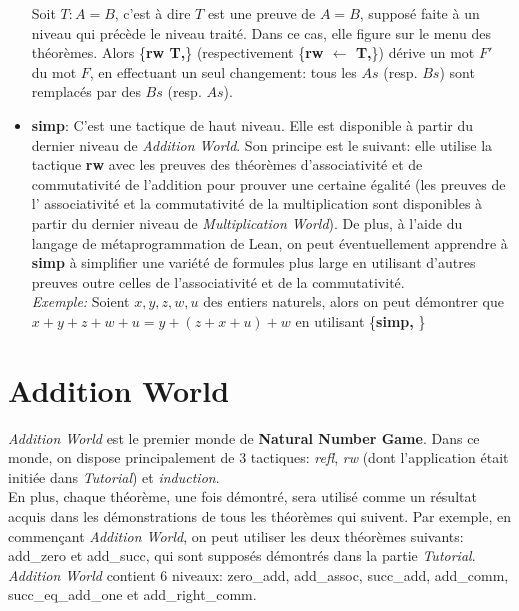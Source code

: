 \documentclass{article}
\begin{document}
\begin{itemize}
    \hspace{1cm} Soit $T: A=B$, c'est à dire $T$ est une preuve de $A=B$, supposé faite à un niveau qui précède le niveau traité. Dans ce cas, elle figure sur le menu des théorèmes. Alors \big\{\textbf{rw T,}\big\} (respectivement \big\{\textbf{rw $\leftarrow$ T,}\big\}) dérive un mot $F'$ du mot $F$, en effectuant un seul changement: tous les $As$ (resp. $Bs$) sont remplacés par des $Bs$ (resp. $As$). 
    \item {\large\textbf{simp}}: C'est une tactique de haut niveau. Elle est disponible à partir du dernier niveau de \textit{Addition World}. Son principe est le suivant: elle utilise la tactique \textbf{rw} avec les preuves des théorèmes d'associativité et de commutativité de l'addition pour prouver une certaine égalité (les preuves de l' associativité et la commutativité de la multiplication sont disponibles à partir du dernier niveau de \textit{Multiplication World}). De plus, à l'aide du langage de métaprogrammation de Lean, on peut éventuellement apprendre  à \textbf{simp} à simplifier une variété de formules plus large en utilisant d'autres preuves outre celles de l'associativité et de la commutativité.   \\
    \textit{Exemple:} Soient $x,y,z,w,u$ des entiers naturels, alors on peut démontrer que $x+y+z+w+u=y+(z+x+u)+w$ en utilisant \big\{\textbf{simp,} \big\}
    
    
\end{itemize}


\section{Addition World}
\textit{Addition World} est le premier monde de \textbf{Natural Number Game}. Dans ce monde, on dispose principalement de 3 tactiques: \textit{refl}, \textit{rw} (dont l'application était initiée dans \textit{Tutorial}) et \textit{induction}.\\
En plus, chaque théorème, une fois démontré, sera utilisé comme un résultat acquis dans les démonstrations de tous les théorèmes qui suivent. Par exemple, en commençant \textit{Addition World}, on peut utiliser les deux théorèmes suivants: add\_zero et add\_succ, qui sont supposés démontrés dans la partie \textit{Tutorial}.\\
\textit{Addition World} contient 6 niveaux: zero\_add, add\_assoc, succ\_add, add\_comm, succ\_eq\_add\_one et add\_right\_comm.
\end{document}
